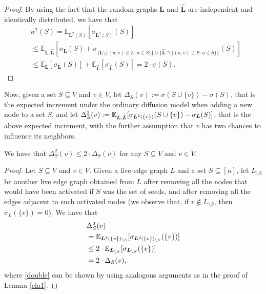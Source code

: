 \begin{proof}
By using the fact that the random graphs $\bm L$ and $\hat{\bm L}$ are independent and identically distributed, we have that 
\begin{align*}
&\sigma^2(S)=\mathbb{E}_{\bm L^2(S)}[\sigma_{\bm L^2(S)}(S)]\\
&\leq \mathbb{E}_{\bm L,\bm \hat{\bm L}}[\sigma_{\bm L}(S)+ \sigma_{\{{\bm L}\setminus \{(u,v)\in E:u\in S\}\}\cup \{{\hat{\bm L}}\cap \{(u,v)\in E:u\in S\}\}}(S)]\\
&\leq \mathbb{E}_{\bm L}[\sigma_{\bm L}(S)]+\mathbb{E}_{\bm \hat{\bm L}}[\sigma_{\hat{\bm L}}(S)]=2\cdot \sigma(S).
\end{align*}
\end{proof}




Now, given a set $S\subseteq V$ and $v\in V$, let $\Delta_S(v):=\sigma(S\cup\{v\})-\sigma(S)$, that is the expected increment under the ordinary diffusion model when adding a new node to a set $S$, and let $\Delta^2_S(v):=\mathbb{E}_{\bm L,\hat{\bm L}}[\sigma_{\bm L^2(\{v\})}(S\cup\{v\})-\sigma_{\bm L}(S)]$, that is the above expected increment, with the further assumption that $v$ has two chances to influence its neighbors.

\begin{lemma}\label{cla.1}
We have that $\Delta^2_S(v)\leq 2\cdot \Delta_S(v)$ for any $S\subseteq V$ and $v\in V$. 
\end{lemma}

\begin{proof}
Let $S\subseteq V$ and $v\in V$. Given a live-edge graph $L$ and a set $S\subseteq [n]$, let $L_{\setminus S}$ be another live edge graph obtained from $L$ after removing all the nodes that would have been activated if $S$ was the set of seeds, and after removing all the edges adjacent to such activated nodes (we observe that, if $v\notin L_{\setminus S}$, then $\sigma_L(\{v\})=0$). We have that 
\begin{align}
&\Delta^2_S(v)\nonumber\\
&= \mathbb{E}_{\bm L^2(\{v\})_{\setminus S}}[\sigma_{\bm L^2(\{v\})_{\setminus S}}(\{v\})]\nonumber\\
&\leq 2\cdot \mathbb{E}_{\bm L_{\setminus S}}[\sigma_{\bm L_{\setminus S}}(\{v\})]\label{double}\\
&=2\cdot \Delta_S(v),\nonumber
\end{align}
where \eqref{double} can be shown by using analogous arguments as in the proof of Lemma \ref{cla1}. 
\end{proof}






